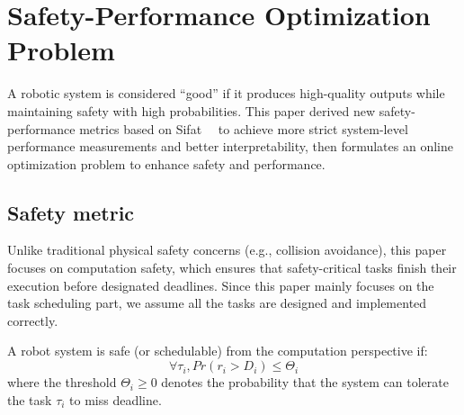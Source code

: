 \section{Safety-Performance Optimization Problem}
	A robotic system is considered ``good'' if it produces high-quality outputs while maintaining safety with high probabilities.
	This paper derived new safety-performance metrics based on Sifat~\etal~\cite{Ash23RAL} to achieve more strict system-level performance measurements and better interpretability, then formulates an online optimization problem to enhance safety and performance.

	\subsection{Safety metric}
    Unlike traditional physical safety concerns (e.g., collision avoidance), this paper focuses on computation safety, which ensures that safety-critical tasks finish their execution before designated deadlines.
    Since this paper mainly focuses on the task scheduling part, we assume all the tasks are designed and implemented correctly.

	\begin{definition}
		A robot system is safe (or schedulable) from the computation perspective if:
		\begin{equation}
			\forall \tau_i, Pr(r_i > D_i) \leq \Theta_i
			\label{eq_safety}
		\end{equation}
		where the threshold $\Theta_i \geq 0$ denotes the probability that the system can tolerate the task $\tau_i$ to miss deadline.
	\end{definition}

